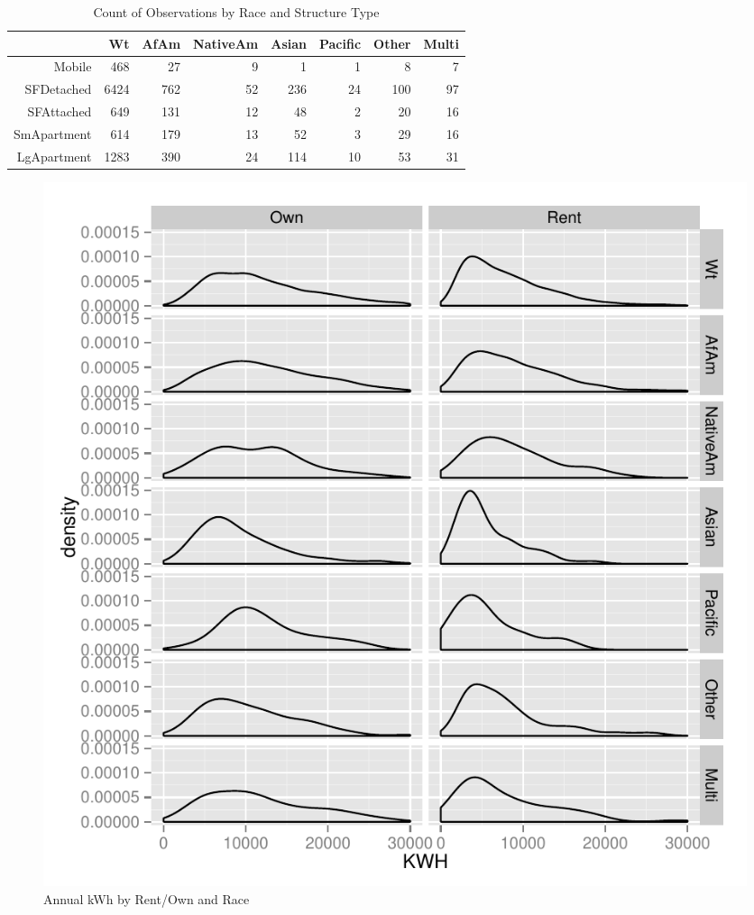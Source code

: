 \documentclass{article}
\begin{document}
\begin{table}[ht]
\centering
\begin{tabular}{rrrrrrrr}
  \hline
 & Wt & AfAm & NativeAm & Asian & Pacific & Other & Multi \\ 
  \hline
Mobile & 468 &  27 &   9 &   1 &   1 &   8 &   7 \\ 
  SFDetached & 6424 & 762 &  52 & 236 &  24 & 100 &  97 \\ 
  SFAttached & 649 & 131 &  12 &  48 &   2 &  20 &  16 \\ 
  SmApartment & 614 & 179 &  13 &  52 &   3 &  29 &  16 \\ 
  LgApartment & 1283 & 390 &  24 & 114 &  10 &  53 &  31 \\ 
   \hline
\end{tabular}
\caption{Count of Observations by Race and Structure Type} 
\label{tab:RaceVStruct}
\end{table}
\begin{figure}
\begin{center}
\caption{Annual kWh by Rent/Own and Race}
\label{fig:kWhbyOwnRace}
\includegraphics{DraftEdwardsWoods-004}
\end{center}
\end{figure}
\end{document}
